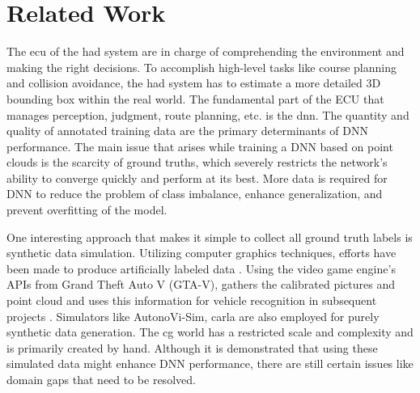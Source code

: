 \chapter{Related Work}
The \acrfull{ecu} of the \acrshort{had} system are in charge of comprehending the environment and making the right decisions. To accomplish high-level tasks like course planning and collision avoidance, the \acrshort{had} system has to estimate a more detailed 3D bounding box within the real world. The fundamental part of the ECU that manages perception, judgment, route planning, etc. is the  \acrfull{dnn}. The quantity and quality of annotated training data are the primary determinants of DNN performance. The main issue that arises while training a DNN based on point clouds is the scarcity of ground truths, which severely restricts the network's ability to converge quickly and perform at its best. More data is required for DNN to reduce the problem of class imbalance, enhance generalization, and prevent overfitting of the model.

One interesting approach that makes it simple to collect all ground truth labels is synthetic data simulation. Utilizing computer graphics techniques, efforts have been made to produce artificially labeled data \parencite{SuQLG15, 8462926, abs-1809-08495}.  Using the video game engine's APIs from Grand Theft Auto V (GTA-V), \parencite{abs-1804-00103} gathers the calibrated pictures and point cloud and uses this information for vehicle recognition in subsequent projects \parencite{8462926}. Simulators like AutonoVi-Sim, \acrshort{carla}  \parencite{8575306, Dosovitskiy17} are also employed for purely synthetic data generation. The \acrlong{cg} world has a restricted scale and complexity and is primarily created by hand. Although it is demonstrated that using these simulated data might enhance DNN performance, there are still certain issues like domain gaps\parencite{zero_domain_gap, care_real_and_syn_gap} that need to be resolved. 

